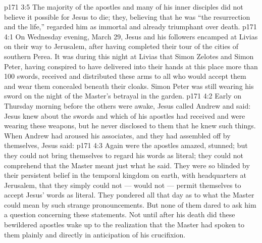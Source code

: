 \vs p171 3:5 The majority of the apostles and many of his inner disciples did not believe it possible for Jesus to die; they, believing that he was “the resurrection and the life,” regarded him as immortal and already triumphant over death.
\vs p171 4:1 On Wednesday evening, March 29, Jesus and his followers encamped at Livias on their way to Jerusalem, after having completed their tour of the cities of southern Perea. It was during this night at Livias that Simon Zelotes and Simon Peter, having conspired to have delivered into their hands at this place more than 100 swords, received and distributed these arms to all who would accept them and wear them concealed beneath their cloaks. Simon Peter was still wearing his sword on the night of the Master’s betrayal in the garden.
\vs p171 4:2 Early on Thursday morning before the others were awake, Jesus called Andrew and said:  Jesus knew about the swords and which of his apostles had received and were wearing these weapons, but he never disclosed to them that he knew such things. When Andrew had aroused his associates, and they had assembled off by themselves, Jesus said: 
\vs p171 4:3 Again were the apostles amazed, stunned; but they could not bring themselves to regard his words as literal; they could not comprehend that the Master meant just what he said. They were so blinded by their persistent belief in the temporal kingdom on earth, with headquarters at Jerusalem, that they simply could not --- would not --- permit themselves to accept Jesus’ words as literal. They pondered all that day as to what the Master could mean by such strange pronouncements. But none of them dared to ask him a question concerning these statements. Not until after his death did these bewildered apostles wake up to the realization that the Master had spoken to them plainly and directly in anticipation of his crucifixion.
